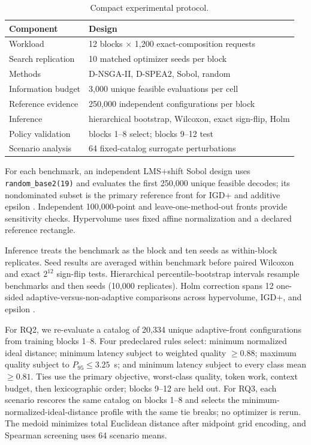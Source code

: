\documentclass[runningheads]{llncs}
\begin{document}
\begin{table}[t]
\caption{Compact experimental protocol.}
\label{tab:protocol}
\centering
\scriptsize
\setlength{\tabcolsep}{3.5pt}
\begin{tabular}{@{}ll@{}}
\toprule
Component & Design \\
\midrule
Workload & 12 blocks $\times$ 1,200 exact-composition requests \\
Search replication & 10 matched optimizer seeds per block \\
Methods & D-NSGA-II, D-SPEA2, Sobol, random \\
Information budget & 3,000 unique feasible evaluations per cell \\
Reference evidence & 250,000 independent configurations per block \\
Inference & hierarchical bootstrap, Wilcoxon, exact sign-flip, Holm \\
Policy validation & blocks 1--8 select; blocks 9--12 test \\
Scenario analysis & 64 fixed-catalog surrogate perturbations \\
\bottomrule
\end{tabular}
\end{table}

For each benchmark, an independent LMS+shift Sobol design uses \texttt{random\_base2(19)} and evaluates the first 250,000 unique feasible decodes; its nondominated subset is the primary reference front for IGD+ and additive epsilon \cite{hv,igd,indicators}. Independent 100,000-point and leave-one-method-out fronts provide sensitivity checks. Hypervolume uses fixed affine normalization and a declared reference rectangle.

Inference treats the benchmark as the block and ten seeds as within-block replicates. Seed results are averaged within benchmark before paired Wilcoxon and exact $2^{12}$ sign-flip tests. Hierarchical percentile-bootstrap intervals resample benchmarks and then seeds (10,000 replicates). Holm correction spans 12 one-sided adaptive-versus-non-adaptive comparisons across hypervolume, IGD+, and epsilon \cite{wilcoxon,holm}.

For RQ2, we re-evaluate a catalog of 20,334 unique adaptive-front configurations from training blocks 1--8. Four predeclared rules select: minimum normalized ideal distance; minimum latency subject to weighted quality $\geq0.88$; maximum quality subject to $P_{95}\leq3.25$~s; and minimum latency subject to every class mean $\geq0.81$. Ties use the primary objective, worst-class quality, token work, context budget, then lexicographic order; blocks 9--12 are held out. For RQ3, each scenario rescores the same catalog on blocks 1--8 and selects the minimum-normalized-ideal-distance profile with the same tie breaks; no optimizer is rerun. The medoid minimizes total Euclidean distance after midpoint grid encoding, and Spearman screening uses 64 scenario means.
\end{document}
